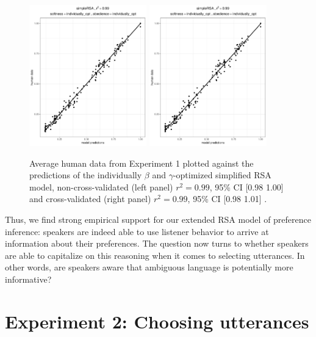\documentclass[10pt,a4paper]{article}
\begin{document}
\begin{figure}[ht]
	\centering
	\includegraphics[width=2in]{images/m5.pdf}
	\includegraphics[width=2in]{images/m8.pdf}
	\caption{Average human data from Experiment 1 plotted against the predictions of the individually $\beta$ and $\gamma$-optimized simplified RSA model, non-cross-validated (left panel) $r^{2}=0.99$, 95\% CI [0.98 1.00] and cross-validated (right panel) $r^{2}=0.99$, 95\% CI [0.98 1.01] .}\label{cross-validation}
\end{figure}


Thus, we find strong empirical support for our extended RSA model of preference inference: speakers are indeed able to use listener behavior to arrive at information about their preferences. The question now turns to whether speakers are able to capitalize on this reasoning when it comes to selecting utterances. In other words, are speakers aware that ambiguous language is potentially more informative?





\section{Experiment 2: Choosing utterances}
\end{document}
